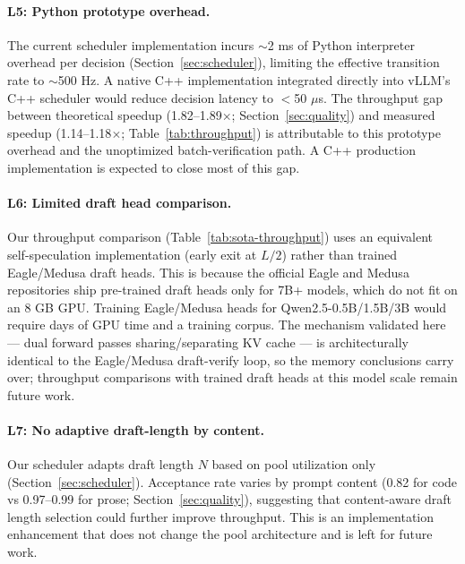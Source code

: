\documentclass[review]{elsarticle}
\theoremstyle{definition}
\theoremstyle{remark}
\begin{document}
\paragraph{L5: Python prototype overhead.}
The current scheduler implementation incurs $\sim$2 ms of Python
interpreter overhead per decision (Section~\ref{sec:scheduler}), limiting
the effective transition rate to $\sim$500 Hz. A native C++ implementation
integrated directly into vLLM's C++ scheduler would reduce decision
latency to $<$50 $\mu$s. The throughput gap between theoretical
speedup (1.82--1.89$\times$; Section~\ref{sec:quality}) and measured
speedup (1.14--1.18$\times$; Table~\ref{tab:throughput}) is attributable
to this prototype overhead and the unoptimized batch-verification path.
A C++ production implementation is expected to close most of this gap.

\paragraph{L6: Limited draft head comparison.}
Our throughput comparison (Table~\ref{tab:sota-throughput}) uses
an equivalent self-speculation implementation (early exit at $L/2$)
rather than trained Eagle/Medusa draft heads. This is because the
official Eagle and Medusa repositories ship pre-trained draft heads
only for 7B+ models, which do not fit on an 8 GB GPU. Training
Eagle/Medusa heads for Qwen2.5-0.5B/1.5B/3B would require days of
GPU time and a training corpus. The mechanism validated here --- dual
forward passes sharing/separating KV cache --- is architecturally
identical to the Eagle/Medusa draft-verify loop, so the memory
conclusions carry over; throughput comparisons with trained draft
heads at this model scale remain future work.

\paragraph{L7: No adaptive draft-length by content.}
Our scheduler adapts draft length $N$ based on pool utilization
only (Section~\ref{sec:scheduler}). Acceptance rate varies by prompt
content (0.82 for code vs 0.97--0.99 for prose; Section~\ref{sec:quality}),
suggesting that content-aware draft length selection could further
improve throughput. This is an implementation enhancement that does not
change the pool architecture and is left for future work.
\end{document}
